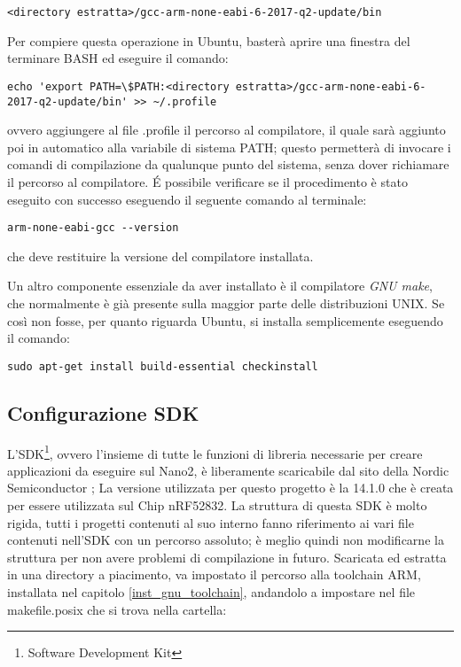 \begin{verbatim}
<directory estratta>/gcc-arm-none-eabi-6-2017-q2-update/bin
\end{verbatim}

Per compiere questa operazione in Ubuntu, basterà aprire una finestra del terminare BASH ed eseguire il comando:

\begin{verbatim}
echo 'export PATH=\$PATH:<directory estratta>/gcc-arm-none-eabi-6-2017-q2-update/bin' >> ~/.profile 
\end{verbatim}

ovvero aggiungere al file .profile il percorso al compilatore, il quale sarà aggiunto poi in automatico alla variabile di sistema PATH; questo permetterà di invocare i comandi di compilazione da qualunque punto del sistema, senza dover richiamare il percorso al compilatore.
\'E possibile verificare se il procedimento è stato eseguito con successo eseguendo il seguente comando al terminale:

\begin{verbatim}
arm-none-eabi-gcc --version
\end{verbatim}
che deve restituire la versione del compilatore installata.

Un altro componente essenziale da aver installato è il compilatore \emph{GNU make}, che normalmente è già presente sulla maggior parte delle distribuzioni UNIX. Se così non fosse, per quanto riguarda Ubuntu, si installa semplicemente eseguendo il comando:

\begin{verbatim}
sudo apt-get install build-essential checkinstall
\end{verbatim}

\subsection{Configurazione SDK}
L'SDK\footnote{Software Development Kit}, ovvero l'insieme di tutte le funzioni di libreria necessarie per creare applicazioni da eseguire sul Nano2, è liberamente scaricabile dal sito della Nordic Semiconductor \cite{sdkweb} ; La versione utilizzata per questo progetto è la 14.1.0 che è creata per essere utilizzata sul Chip nRF52832.
La struttura di questa SDK è molto rigida, tutti i progetti contenuti al suo interno fanno riferimento ai vari file contenuti nell'SDK con un percorso assoluto; è meglio quindi non modificarne la struttura per non avere problemi di compilazione in futuro.
Scaricata ed estratta in una directory a piacimento, va impostato il percorso alla toolchain ARM, installata nel capitolo \ref{inst_gnu_toolchain}, andandolo a impostare nel file makefile.posix che si trova nella cartella: 


